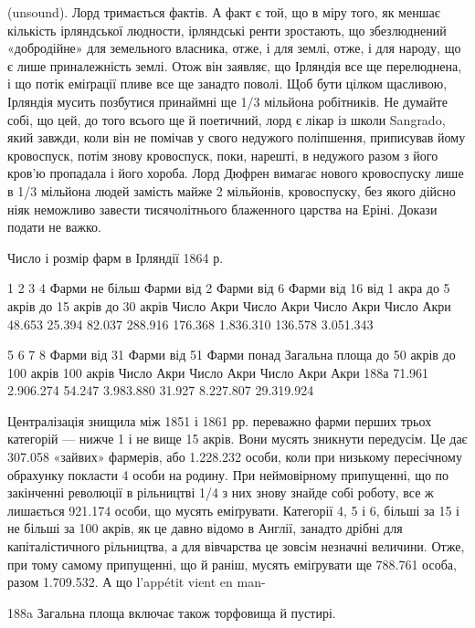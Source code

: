 (unsound). Лорд тримається фактів. А факт є той, що в міру того,
як меншає кількість ірляндської людности, ірляндські ренти
зростають, що збезлюднений «добродійне» для земельного власника,
отже, і для землі, отже, і для народу, що є лише приналежність
землі. Отож він заявляє, що Ірляндія все ще перелюднена,
і що потік еміґрації пливе все ще занадто поволі. Щоб бути цілком
щасливою, Ірляндія мусить позбутися принаймні ще 1/3 мільйона
робітників. Не думайте собі, що цей, до того всього ще й
поетичний, лорд є лікар із школи Sangrado, який завжди, коли
він не помічав у свого недужого поліпшення, приписував йому
кровоспуск, потім знову кровоспуск, поки, нарешті, в недужого
разом з його кров’ю пропадала і його хороба. Лорд Дюфрен
вимагає нового кровоспуску лише в 1/3 мільйона людей
замість майже 2 мільйонів, кровоспуску, без якого дійсно ніяк
неможливо завести тисячолітнього блаженного царства на Еріні.
Докази подати не важко.

Число і розмір фарм в Ірляндії 1864 р.

             1                                2                           3                         
               4
Фарми не більш        Фарми  від 2      Фарми від 6                 Фарми від 16
      від 1 акра                 до 5 акрів          до 15 акрів                   до 30 акрів
Число      Акри           Число    Акри      Число     Акри             Число      Акри
 48.653    25.394          82.037  288.916    176.368   1.836.310  136.578   3.051.343

          5                                   6                                7                    
              8
Фарми від 31              Фарми від 51              Фарми понад           Загальна площа
   до 50 акрів                   до 100 акрів               100 акрів
Число    Акри               Число    Акри              Число   Акри                 Акри 188а
71.961  2.906.274          54.247   3.983.880       31.927 8.227.807              29.319.924

Централізація знищила між 1851 і 1861 рр. переважно фарми
перших трьох категорій — нижче 1 і не вище 15 акрів. Вони
мусять зникнути передусім. Це дає 307.058 «зайвих» фармерів,
або 1.228.232 особи, коли при низькому пересічному обрахунку
покласти 4 особи на родину. При неймовірному припущенні, що
по закінченні революції в рільництві 1/4 з них знову знайде собі
роботу, все ж лишається 921.174 особи, що мусять еміґрувати. Категорії
4, 5 і 6, більші за 15 і не більші за 100 акрів, як це давно
відомо в Англії, занадто дрібні для капіталістичного рільництва,
а для вівчарства це зовсім незначні величини. Отже, при
тому самому припущенні, що й раніш, мусять еміґрувати ще
788.761 особа, разом 1.709.532. А що l’appétit vient en man-

188a Загальна площа включає також торфовища й пустирі.
